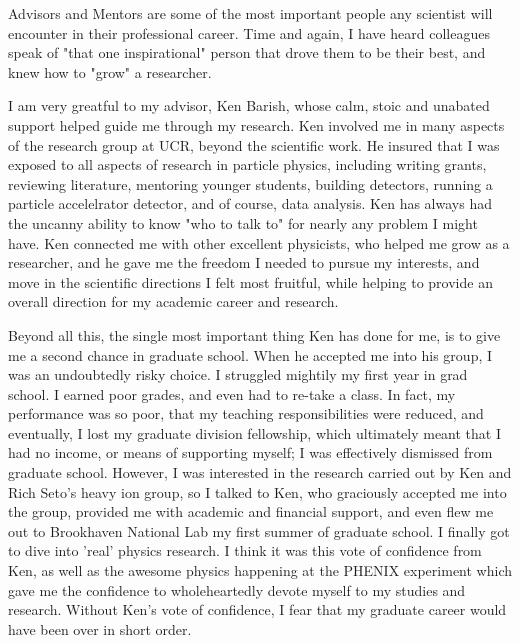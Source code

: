 Advisors and Mentors are some of the most important people any scientist will
encounter in their professional career. Time and again, I have heard colleagues
speak of "that one inspirational" person that drove them to be their best, and
knew how to "grow" a researcher. 

I am very greatful to my advisor, Ken Barish, whose calm, stoic and unabated
support helped guide me through my research. Ken involved me in many aspects of
the research group at UCR, beyond the scientific work. He insured that I was
exposed to all aspects of research in particle physics, including writing
grants, reviewing literature, mentoring younger students, building detectors,
running a particle accelelrator detector, and of course, data analysis.  Ken has
always had the uncanny ability to know "who to talk to" for nearly any problem I
might have. Ken connected me with other excellent physicists, who helped me grow
as a researcher, and he gave me the freedom I needed to pursue my interests, and
move in the scientific directions I felt most fruitful, while helping to provide
an overall direction for my academic career and research. 

Beyond all this, the single most important thing Ken has done for me, is to give
me a second chance in graduate school. When he accepted me into his group, I was
an undoubtedly risky choice. I struggled mightily my first year in grad school.
I earned poor grades, and even had to re-take a class. In fact, my performance
was so poor, that my teaching responsibilities were reduced, and eventually, I
lost my graduate division fellowship, which ultimately meant that I had no
income, or means of supporting myself; I was effectively dismissed from graduate
school. However, I was interested in the research carried out by Ken and Rich
Seto's heavy ion group, so I talked to Ken, who graciously accepted me into the
group, provided me with academic and financial support, and even flew me out to
Brookhaven National Lab my first summer of graduate school. I finally got to
dive into 'real' physics research. I think it was this vote of confidence from
Ken, as well as the awesome physics happening at the PHENIX experiment which
gave me the confidence to wholeheartedly devote myself to my studies and
research. Without Ken's vote of confidence, I fear that my graduate career would
have been over in short order.


